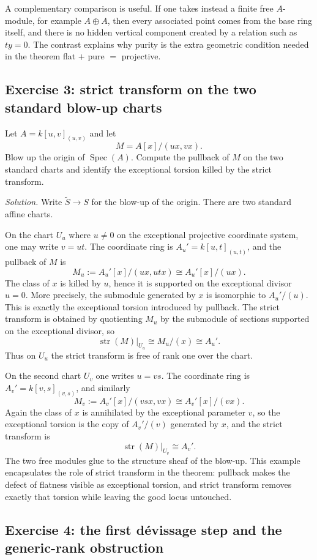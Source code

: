 \documentclass[11pt,oneside]{article}
\newcommand{\Spec}{\operatorname{Spec}}
\newcommand{\st}{\operatorname{str}}
\begin{document}
A complementary comparison is useful.  If one takes instead a finite free $A$-module, for example $A\oplus A$, then every associated point comes from the base ring itself, and there is no hidden vertical component created by a relation such as $ty=0$.  The contrast explains why purity is the extra geometric condition needed in the theorem flat $+$ pure $=$ projective.

\subsection*{Exercise 3: strict transform on the two standard blow-up charts}

Let $A=k[u,v]_{(u,v)}$ and let
\[
M=A[x]/(ux,vx).
\]
Blow up the origin of $\Spec(A)$.  Compute the pullback of $M$ on the two standard charts and identify the exceptional torsion killed by the strict transform.

\emph{Solution.}  Write $\widetilde S\to S$ for the blow-up of the origin.  There are two standard affine charts.

On the chart $U_u$ where $u\neq 0$ on the exceptional projective coordinate system, one may write $v=ut$.  The coordinate ring is $A_u'=k[u,t]_{(u,t)}$, and the pullback of $M$ is
\[
M_u:=A_u'[x]/(ux,utx)\cong A_u'[x]/(ux).
\]
The class of $x$ is killed by $u$, hence it is supported on the exceptional divisor $u=0$.  More precisely, the submodule generated by $x$ is isomorphic to $A_u'/(u)$.  This is exactly the exceptional torsion introduced by pullback.  The strict transform is obtained by quotienting $M_u$ by the submodule of sections supported on the exceptional divisor, so
\[
\st(M)|_{U_u}\cong M_u/(x)\cong A_u'.
\]
Thus on $U_u$ the strict transform is free of rank one over the chart.

On the second chart $U_v$ one writes $u=vs$.  The coordinate ring is $A_v'=k[v,s]_{(v,s)}$, and similarly
\[
M_v:=A_v'[x]/(vsx,vx)\cong A_v'[x]/(vx).
\]
Again the class of $x$ is annihilated by the exceptional parameter $v$, so the exceptional torsion is the copy of $A_v'/(v)$ generated by $x$, and the strict transform is
\[
\st(M)|_{U_v}\cong A_v'.
\]
The two free modules glue to the structure sheaf of the blow-up.  This example encapsulates the role of strict transform in the theorem: pullback makes the defect of flatness visible as exceptional torsion, and strict transform removes exactly that torsion while leaving the good locus untouched.

\subsection*{Exercise 4: the first d\'evissage step and the generic-rank obstruction}
\end{document}
